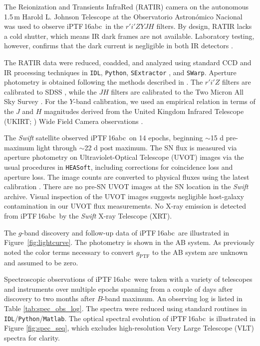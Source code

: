 \documentclass[twocolumn]{aastex61}
\newcommand{\abc}{iPTF\,16abc}
\begin{document}
The Reionization and Transients InfraRed (RATIR) camera on the autonomous 1.5\,m Harold L. Johnson Telescope at the Observatorio Astron\'{o}mico Nacional \citep{2012SPIE.8446E..10B,2012SPIE.8444E..5LW} was used to observe \abc\ in the $r'i'ZYJH$ filters. By design, RATIR lacks a cold shutter, which means IR dark frames are not available. Laboratory testing, however, confirms that the dark current is negligible in both IR detectors \citep{2012SPIE.8453E..1OF}.

The RATIR data were reduced, coadded, and analyzed using standard CCD and IR processing techniques in \texttt{IDL}, \texttt{Python}, \texttt{SExtractor} \citep{1996A&AS..117..393B}, and \texttt{SWarp}. Aperture photometry is obtained following the methods described in \citet{2014AJ....148....2L}. The $r'i'Z$ filters are calibrated to SDSS \citep{2014ApJS..211...17A}, while the $JH$ filters are calibrated to the Two Micron All Sky Survey \citep{2006AJ....131.1163S}. For the $Y$-band calibration, we used an empirical relation in terms of the $J$ and $H$ magnitudes derived from the United Kingdom Infrared Telescope (UKIRT; \citealt{2007A&A...467..777C}) Wide Field Camera observations \citep{2009MNRAS.394..675H}.

The \textit{Swift} satellite observed \abc\ on 14 epochs, beginning 
$\sim$15 d pre-maximum light through $\sim$22 d post maximum. The SN 
flux is measured via aperture photometry on Ultraviolet-Optical
Telescope (UVOT) images via the usual procedures in 
\texttt{HEASoft}, including corrections for coincidence loss and 
aperture loss. The image counts
are converted to physical fluxes using the latest calibration
\citep{2011AIPC.1358..373B}. There are no pre-SN UVOT images at the 
SN location in the \textit{Swift} archive.  Visual inspection of the
UVOT images suggests negligible host-galaxy contamination in our 
UVOT flux measurements. No X-ray emission is detected from \abc\ by the \textit{Swift} X-ray Telescope (XRT).

The $g$-band discovery and follow-up data of \abc\ are 
illustrated in Figure~\ref{fig:lightcurve}.  The photometry is shown in the AB system. As previously noted the color terms necessary to convert $g_\mathrm{PTF}$ to the AB system are unknown and assumed to be zero.

Spectroscopic observations of \abc\ were taken with a variety
of telescopes and instruments over multiple epochs spanning from a
couple of days after discovery to two months after $B$-band maximum. 
An observing log is listed in Table \ref{tab:spec_obs_log}. The spectra were reduced using standard routines in \texttt{IDL}/\texttt{Python}/\texttt{Matlab}. The optical
spectral evolution of \abc\ is illustrated in Figure
\ref{fig:spec_seq}, which excludes high-resolution Very Large Telescope (VLT) spectra for clarity.
\end{document}
